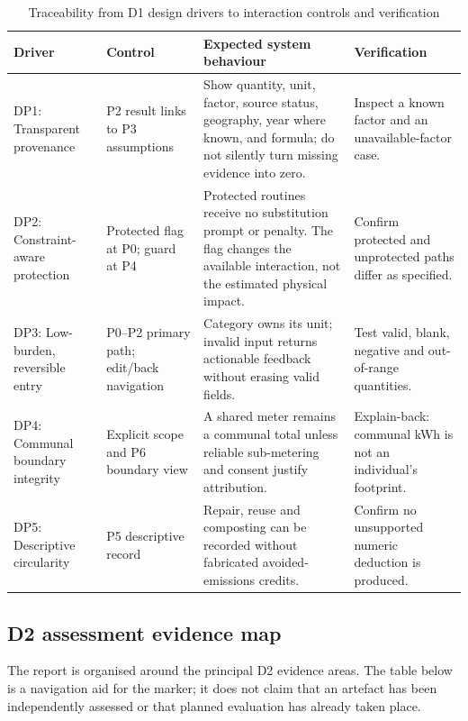 \documentclass[12pt,a4paper]{article}
\begin{document}
\begin{table}[ht]
\centering
\small
\caption{Traceability from D1 design drivers to interaction controls and verification}
\label{tab:design-controls}
\footnotesize
\setlength{\emergencystretch}{1em}
\begin{tabularx}{\textwidth}{|>{\raggedright\arraybackslash}p{2.7cm}|>{\raggedright\arraybackslash}p{2.7cm}|>{\raggedright\arraybackslash}X|>{\raggedright\arraybackslash}p{2.7cm}|}
\toprule
\textbf{Driver} & \textbf{Control} & \textbf{Expected system behaviour} & \textbf{Verification}\\
\midrule
DP1: Transparent provenance & P2 result links to P3 assumptions & Show quantity, unit, factor, source status, geography, year where known, and formula; do not silently turn missing evidence into zero. & Inspect a known factor and an unavailable-factor case.\\
\rowcolor{brandlight}
DP2: Constraint-aware protection & Protected flag at P0; guard at P4 & Protected routines receive no substitution prompt or penalty. The flag changes the available interaction, not the estimated physical impact. & Confirm protected and unprotected paths differ as specified.\\
DP3: Low-burden, reversible entry & P0--P2 primary path; edit/back navigation & Category owns its unit; invalid input returns actionable feedback without erasing valid fields. & Test valid, blank, negative and out-of-range quantities.\\
\rowcolor{brandlight}
DP4: Communal boundary integrity & Explicit scope and P6 boundary view & A shared meter remains a communal total unless reliable sub-metering and consent justify attribution. & Explain-back: communal kWh is not an individual's footprint.\\
DP5: Descriptive circularity & P5 descriptive record & Repair, reuse and composting can be recorded without fabricated avoided-emissions credits. & Confirm no unsupported numeric deduction is produced.\\
\bottomrule
\end{tabularx}
\end{table}


\subsection{D2 assessment evidence map}
The report is organised around the principal D2 evidence areas. The table below is a navigation aid for the marker; it does not claim that an artefact has been independently assessed or that planned evaluation has already taken place.
\end{document}
